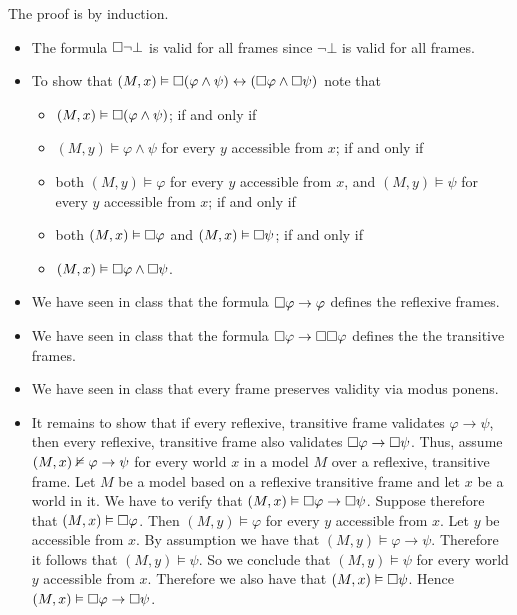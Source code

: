 \documentclass{article}
\begin{document}
\begin{ex}
The proof is by induction.
\begin{itemize}
\item The formula $\square\neg\bot$ is valid for all frames since $\neg\bot$ is valid for all frames.
\item To show that $(M,x)\vDash\square(\varphi\land\psi)\leftrightarrow(\square\varphi\land\square\psi)$
note that 
\begin{itemize}
\item $(M,x)\vDash\square(\varphi\land\psi)$; if and only if
\item $(M,y)\models\varphi\land\psi$ for every $y$ accessible from $x$; if and only if
\item both $(M,y)\models\varphi$ for every $y$ accessible from $x$, and $(M,y)\models\psi$ for every
$y$ accessible from $x$; if and only if
\item both $(M,x)\vDash\square\varphi$ and $(M,x)\vDash\square\psi$; if and only if
\item $(M,x)\vDash\square\varphi\land\square\psi$.
\end{itemize}
\item We have seen in class that the formula $\square\varphi\to\varphi$ defines the reflexive
frames.
\item We have seen in class that the formula $\square\varphi\to\square\square\varphi$ defines the the
transitive frames.
\item We have seen in class that every frame preserves validity via modus ponens.
\item It remains to show that if every reflexive, transitive frame validates $\varphi\to\psi$,
then every reflexive, transitive frame also validates $\square\varphi\to\square\psi$. Thus, assume $(M,x)\nvDash\varphi\to\psi$
for every world $x$ in a model $M$ over a reflexive, transitive frame. Let $M$ be a model
based on a reflexive transitive frame and let $x$ be a world in it. We have to verify that
$(M,x)\vDash\square\varphi\to\square\psi$. Suppose therefore that $(M,x)\vDash\square\varphi$. Then
$(M,y)\models\varphi$ for every $y$ accessible from $x$. Let $y$ be accessible from $x$.
By assumption we have that
$(M,y)\models\varphi\to\psi$. Therefore it follows that $(M,y)\models\psi$. So we conclude
that $(M,y)\models\psi$ for every world $y$ accessible from $x$. Therefore we also have
that $(M,x)\vDash\square\psi$. Hence $(M,x)\vDash\square\varphi\to\square\psi$.
\end{itemize} 
\end{ex}
\end{document}
